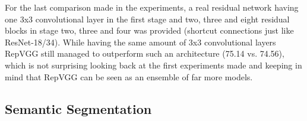 For the last comparison made in the experiments, a real residual network having one 3x3 convolutional layer in the first stage and two, three and eight residual blocks in stage two, three and four was provided (shortcut connections just like ResNet-18/34). While having the same amount of 3x3 convolutional layers RepVGG still managed to outperform such an architecture (75.14 vs. 74.56), which is not surprising looking back at the first experiments made and keeping in mind that RepVGG can be seen as an ensemble of far more models. 

\subsection{Semantic Segmentation}
